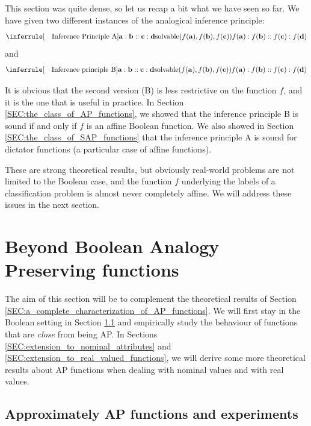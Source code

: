This section was quite dense, so let us recap a bit what we have seen so far.
We have given two different instances of the analogical inference principle:
$$
\inferrule[\text{~~ Inference Principle A}]{\mathbf{a} : \mathbf{b} ::
\mathbf{c} : \mathbf{d}}{\solvable(f(\mathbf{a}), f(\mathbf{b}),
f(\mathbf{c}))\\\\ f(\mathbf{a}) : f(\mathbf{b}) :: f(\mathbf{c}) :
f(\mathbf{d}) } $$
and
$$
\inferrule[\text{~~ Inference principle B}]{\mathbf{a} : \mathbf{b} ::
\mathbf{c} : \mathbf{d} \\\\ \solvable(f(\mathbf{a}), f(\mathbf{b}),
f(\mathbf{c}))}{f(\mathbf{a}) : f(\mathbf{b}) :: f(\mathbf{c}) : f(\mathbf{d})}
$$

It is obvious that the second version (B) is less restrictive on the function
$f$, and it is the one that is useful in practice. In Section
\ref{SEC:the_class_of_AP_functions}, we showed that the inference principle B
is sound if and only if $f$ is an affine Boolean function. We also showed in
Section \ref{SEC:the_class_of_SAP_functions} that the inference principle A
is sound for dictator functions (a particular case of affine functions).

These are strong theoretical results, but obviously real-world problems are not
limited to the Boolean case, and the function $f$ underlying the labels of a
classification problem is almost never completely affine. We will address these
issues in the next section.

\section{Beyond Boolean Analogy Preserving functions}
\label{SEC:beyond_boolean_AP_functions}

The aim of this section will be to complement the theoretical results of
Section \ref{SEC:a_complete_characterization_of_AP_functions}. We will first
stay in the Boolean setting in Section \ref{SEC:approximate_ap_functions}
and empirically study the behaviour of functions that  are \textit{close} from
being AP. In Sections \ref{SEC:extension_to_nominal_attributes} and
\ref{SEC:extension_to_real_valued_functions}, we will derive some more
theoretical results about AP functions when dealing with nominal values and
with real values.

\subsection{Approximately AP functions and experiments}
\label{SEC:approximate_ap_functions}

